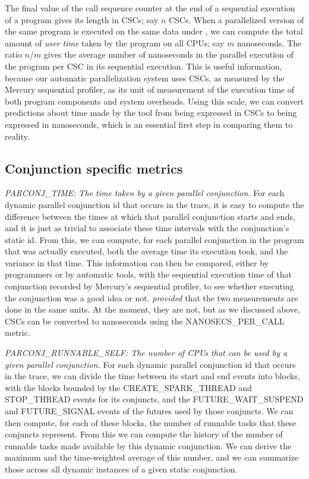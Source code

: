 The final value of the call sequence counter
at the end of a sequential execution of a program 
gives its length in CSCs; say $n$ CSCs.
When a parallelized version of the same program is executed on the same data
under \tscope,
we can compute the total amount of \emph{user time}
taken by the program on all CPUs; say $m$ nanoseconds.
The ratio $n/m$ gives the average number of nanoseconds
in the parallel execution of the program
per CSC in its sequential execution.
This is useful information,
because our automatic parallelization system
uses CSCs, as measured by the Mercury sequential profiler,
as its unit of measurement of the execution time 
of both program components and system overheads.
Using this scale, we can convert predictions about time made by the tool
from being expressed in CSCs to being expressed in nanoseconds,
which is an essential first step in comparing them to reality.

\subsection{Conjunction specific metrics}

\emph{PARCONJ\_TIME: The time taken by a given parallel conjunction.}
For each dynamic parallel conjunction id that occurs in the trace,
it is easy to compute the difference between
the times at which that parallel conjunction starts and ends,
and it is just as trivial to associate these time intervals
with the conjunction's static id.
From this, we can compute,
for each parallel conjunction in the program that was actually executed,
both the average time its execution took,
and the variance in that time.
This information can then be compared,
either by programmers or by automatic tools,
with the sequential execution time of that conjunction recorded by
Mercury's sequential profiler,
to see whether executing the conjunction was a good idea or not.
\emph{provided} that the two measurements are done in the same units.
At the moment, they are not, but as we discussed above,
CSCs can be converted to nanoseconds using the NANOSECS\_PER\_CALL metric.

\emph{PARCONJ\_RUNNABLE\_SELF:
The number of CPUs that can be used by a given parallel conjunction.}
For each dynamic parallel conjunction id that occurs in the trace,
we can divide the time between its start and end events into blocks,
with the blocks bounded by
the CREATE\_SPARK\_THREAD and STOP\_THREAD events for its conjuncts,
and the FUTURE\_WAIT\_SUSPEND and FUTURE\_SIGNAL events
of the futures used by those conjuncts.
We can then compute, for each of these blocks,
the number of runnable tasks that these conjuncts represent.
From this we can compute the history of the number
of runnable tasks made available by this dynamic conjunction.
We can derive the maximum and the time-weighted average of this number,
and we can summarize those
across all dynamic instances of a given static conjunction.

